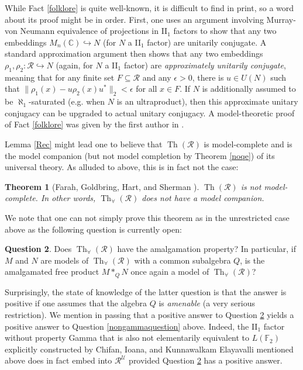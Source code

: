 \documentclass[12pt]{amsart}
\newtheorem{thm}{Theorem}[section]
\theoremstyle{definition}
\newtheorem{question}[thm]{Question}
\def\bb{\mathbb}
\def\bb{\mathbb}
\def\u{\mathsf 1}
\def \Th{\operatorname{Th}}
\def \R{\mathcal R}
\def \u{\mathcal U}
\begin{document}
While Fact \ref{folklore} is quite well-known, it is difficult to find in print, so a word about its proof might be in order.  First, one uses an argument involving Murray-von Neumann equivalence of projections in II$_1$ factors to show that any two embeddings $M_n(\bb C)\hookrightarrow N$ (for $N$ a II$_1$ factor) are unitarily conjugate.  A standard approximation argument then shows that any two embeddings $\rho_1,\rho_2:\R\hookrightarrow N$ (again, for $N$ a II$_1$ factor) are \emph{approximately unitarily conjugate}, meaning that for any finite set $F\subseteq \R$ and any $\epsilon>0$, there is $u\in U(N)$ such that $\|\rho_1(x)-u\rho_2(x)u^*\|_2<\epsilon$ for all $x\in F$.  If $N$ is additionally assumed to be $\aleph_1$-saturated (e.g. when $N$ is an ultraproduct), then this approximate unitary conjugacy can be upgraded to actual unitary conjugacy.  A model-theoretic proof of Fact \ref{folklore} was given by the first author in \cite{resembles}.

Lemma \ref{Rec} might lead one to believe that $\Th(\R)$ is model-complete and is the model companion (but not model completion by Theorem \ref{noqe}) of its universal theory.  As alluded to above, this is in fact not the case:

\begin{thm}[Farah, Goldbring, Hart, and Sherman \cite{ecfactors}]\label{notmodelcomplete}
$\Th(\R)$ is not model-complete.  In other words, $\Th_\forall(\R)$ does not have a model companion.
\end{thm}

We note that one can not simply prove this theorem as in the unrestricted case above as the following question is currently open:

\begin{question}\label{amalgamated}
Does $\Th_\forall(\R)$ have the amalgamation property?  In particular, if $M$ and $N$ are models of $\Th_\forall(\R)$ with a common subalgebra $Q$, is the amalgamated free product $M*_QN$ once again a model of $\Th_\forall(\R)$?
\end{question}

Surprisingly, the state of knowledge of the latter question is that the answer is positive if one assumes that the algebra $Q$ is \emph{amenable} (a very serious restriction).  We mention in passing that a positive answer to Question \ref{amalgamated} yields a positive answer to Question \ref{nongammaquestion} above.  Indeed, the II$_1$ factor without property Gamma that is also not elementarily equivalent to $L(\bb F_2)$ explicitly constructed by Chifan, Ioana, and Kunnawalkam Elayavalli mentioned above does in fact embed into $\R^\u$ provided Question \ref{amalgamated} has a positive answer.
\end{document}

